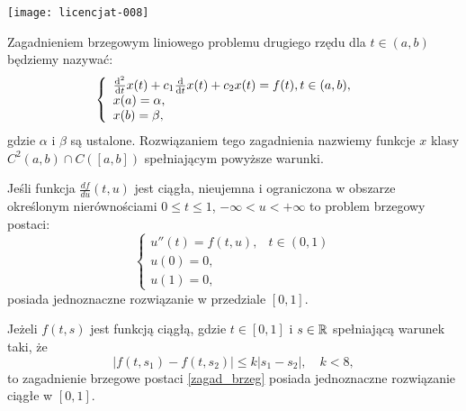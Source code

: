 \documentclass[notheorems]{beamer}
\begin{document}
\begin{frame} 
\texttt{[image: licencjat-008]}
\end{frame}
\begin{frame}
\begin{problem}
Zagadnieniem brzegowym liniowego problemu drugiego rzędu dla $ t \in (a,b) $ będziemy nazywać:
\begin{equation}
\left\{\begin{array}{ll}
\ddx [^2]{t} x(t) + c_1\ddx{t} x(t) + c_2x(t) = f(t), t \in (a,b), & \\
x(a) = \alpha, & \\
x(b) = \beta ,&
\end{array} \right.
\end{equation}
gdzie $\alpha$ i $\beta$ są ustalone. Rozwiązaniem tego zagadnienia nazwiemy funkcje $x$ klasy $C^2(a,b) \cap C([a,b])$ spełniającym powyższe warunki.
\end{problem}
\end{frame}
\begin{frame}
\begin{small}
\begin{theorem}
Jeśli funkcja $\frac{df}{du}(t,u)$ jest ciągła, nieujemna i ograniczona w obszarze określonym nierównościami $0\leq t \leq 1$, $-\infty < u < +\infty$ to problem brzegowy postaci:
\begin{equation}\label{zagad_brzeg}
\left\{\begin{array}{ll}
u''(t)=f(t,u), & t \in (0,1) \\
u(0)=0, & \\
u(1)=0,
\end{array}\right.
\end{equation}
posiada jednoznaczne rozwiązanie w przedziale $[0,1]$.
\end{theorem}
\begin{theorem}
Jeżeli $f(t,s)$ jest funkcją ciągłą, gdzie $t \in [0,1]$ i $s \in \setR$ spełniającą warunek taki, że
$$
|f(t,s_1) - f(t,s_2)| \leq k|s_1 - s_2|, \quad k<8,
$$
to zagadnienie brzegowe postaci \eqref{zagad_brzeg} posiada jednoznaczne rozwiązanie ciągłe w $[0,1]$. 
\end{theorem}
\end{small}
\end{frame}
\end{document}
